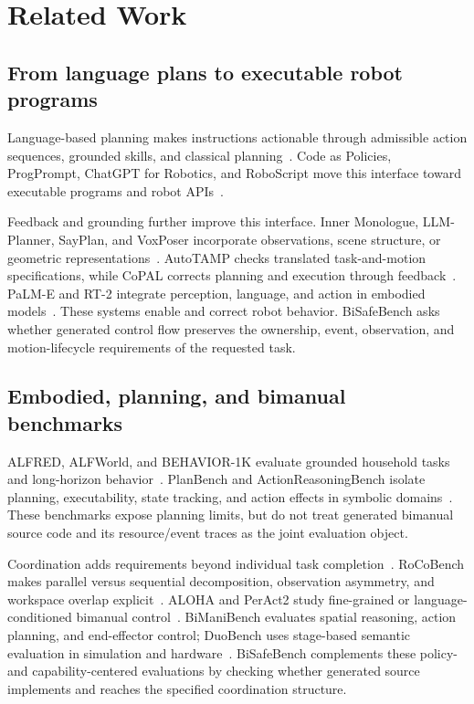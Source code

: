 \documentclass[letterpaper,10pt,conference]{ieeeconf}
\begin{document}
\section{Related Work}
\subsection{From language plans to executable robot programs}
Language-based planning makes instructions actionable through admissible action sequences, grounded skills, and classical planning~\cite{zeroshotplanner,saycan,llmp}. Code as Policies, ProgPrompt, ChatGPT for Robotics, and RoboScript move this interface toward executable programs and robot APIs~\cite{cap,progprompt,chatgptrobotics,roboscript}.

Feedback and grounding further improve this interface. Inner Monologue, LLM-Planner, SayPlan, and VoxPoser incorporate observations, scene structure, or geometric representations~\cite{innermonologue,llmplanner,sayplan,voxposer}. AutoTAMP checks translated task-and-motion specifications, while CoPAL corrects planning and execution through feedback~\cite{autotamp,copal}. PaLM-E and RT-2 integrate perception, language, and action in embodied models~\cite{palme,rt2}. These systems enable and correct robot behavior. BiSafeBench asks whether generated control flow preserves the ownership, event, observation, and motion-lifecycle requirements of the requested task.

\subsection{Embodied, planning, and bimanual benchmarks}
ALFRED, ALFWorld, and BEHAVIOR-1K evaluate grounded household tasks and long-horizon behavior~\cite{alfred,alfworld,behavior1k}. PlanBench and ActionReasoningBench isolate planning, executability, state tracking, and action effects in symbolic domains~\cite{planbench,actionreasoning}. These benchmarks expose planning limits, but do not treat generated bimanual source code and its resource/event traces as the joint evaluation object.

Coordination adds requirements beyond individual task completion~\cite{dualarmsurvey}. RoCoBench makes parallel versus sequential decomposition, observation asymmetry, and workspace overlap explicit~\cite{roco}. ALOHA and PerAct2 study fine-grained or language-conditioned bimanual control~\cite{aloha,peract2}. BiManiBench evaluates spatial reasoning, action planning, and end-effector control; DuoBench uses stage-based semantic evaluation in simulation and hardware~\cite{bimanibench,duobench}. BiSafeBench complements these policy- and capability-centered evaluations by checking whether generated source implements and reaches the specified coordination structure.
\end{document}
